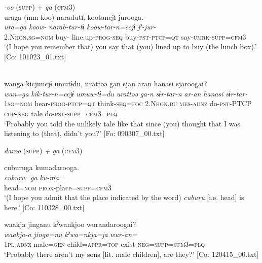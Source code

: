 \ea\label{ex:10.47}   
 \begin{xlist}
 \exi{} \textit{{}-oo} (\textsc{supp}) + \textit{ga} (\textsc{cfm}3)\\
  \ex  %
      \glll    uraga  (mm  koo)  naradutɨ,  kootancjɨ    jurooga.\\
      \textit{ura=ga}  {}  \textit{koow-}  \textit{narab-tur-tɨ}  \textit{koow-tar-n=ccjɨ}  \textit{jˀ-jur-}\\
      2.N\textsc{hon}.\textsc{sg}=\textsc{nom}  {}  buy-  line.up-\textsc{prog}-\textsc{seq}  buy-\textsc{pst}-\textsc{ptcp}=\textsc{qt}  say-\textsc{umrk}-\textsc{supp}=\textsc{cfm}3\\
      \glt       ‘(I hope you remember that) you say that (you) lined up to buy (the lunch box).’ [Co: 101023\_01.txt]

  \ex\relax  [= (8-41)]\\
      \glll    wanga  kicjuncjɨ  umutɨdu,  urattəə   gan  sjan  aran  hanasi  sjaroogai?\\
      \textit{wan=ga}  \textit{kik-tur-n=ccjɨ}  \textit{umuw-tɨ=du}  \textit{urattəə}   \textit{ga-n}  \textit{sɨr-tar-n}  \textit{ar-an}  \textit{hanasi}  \textit{sɨr-tar-}\\
      1\textsc{sg}=\textsc{nom}  hear-\textsc{prog}-\textsc{ptcp}=\textsc{qt}  think-\textsc{seq}=\textsc{foc}  2.N\textsc{hon}.\textsc{du}  \textsc{mes}-\textsc{adnz}  do-\textsc{pst}-PTCP  \textsc{cop}-\textsc{neg}  tale  do-\textsc{pst}-\textsc{supp}=\textsc{cfm}3=\textsc{plq}\\
      \glt       ‘Probably you told the unlikely tale like that since (you) thought that I was listening to (that), didn’t you?’ [Fo: 090307\_00.txt]

  \exi{} \textit{daroo} (\textsc{supp}) \textit{+} \textit{ga} (\textsc{cfm}3)

  \ex  %
      \glll    cuburuga  kumadarooga.\\
      \textit{cuburu=ga}  \textit{ku-ma=}\\
      head=\textsc{nom}  \textsc{prox}-place=\textsc{supp}=\textsc{cfm}3\\
      \glt       ‘(I hope you admit that the place indicated by the word) \textit{cuburu} [i.e. head] is here.’ [Co: 110328\_00.txt]

  \ex  %
      \glll    waakja  jinganu  kˀwankjoo  wurandaroogai?\\
      \textit{waakja-a}  \textit{jinga=nu}  \textit{kˀwa=nkja=ja}  \textit{wur-an=}\\
      1\textsc{pl}-\textsc{adnz}  male=\textsc{gen}  child=\textsc{appr}=\textsc{top}  exist-\textsc{neg}=\textsc{supp}=\textsc{cfm}3=\textsc{plq}\\
      \glt       ‘Probably there aren’t my sons [lit. male children], are they?’ [Co: 120415\_00.txt]
    \end{xlist}
\z

